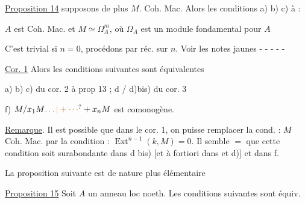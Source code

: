 \uline{Proposition 14}   supposons de plus $M$. Coh. Mac. Alors les conditions a) b) c)  à :

$A$ est Coh. Mac. et $M\simeq\Omega_A^{m}$, où $\Omega_A$ est un module fondamental pour $A$

C'est trivial si $n=0$, procédons par réc. sur $n$. Voir les notes jaunes - - - - -

 

\uline{Cor. 1}   Alors les conditions  suivantes sont équivalentes 

a) b) c) du cor. 2 à prop 13 ; d / d)bis) du cor. 3






f) $M/x_1M\unsure{\ldots|+\cdots} + x_nM$  est comonogène.

\uline{Remarque}. Il est possible que dans le cor. 1,  on puisse remplacer  la cond. : $M$ Coh. Mac. par la condition : $\operatorname{Ext}^{n-1}(k,M)=0$. Il semble $=$ que cette condition soit surabondante dans d bis)  [et à fortiori dans  et d)]  et  dans f.

La proposition suivante est de nature plus élémentaire

\uline{Proposition 15} Soit $A$ un anneau loc noeth. Les conditions suivantes sont équiv.

